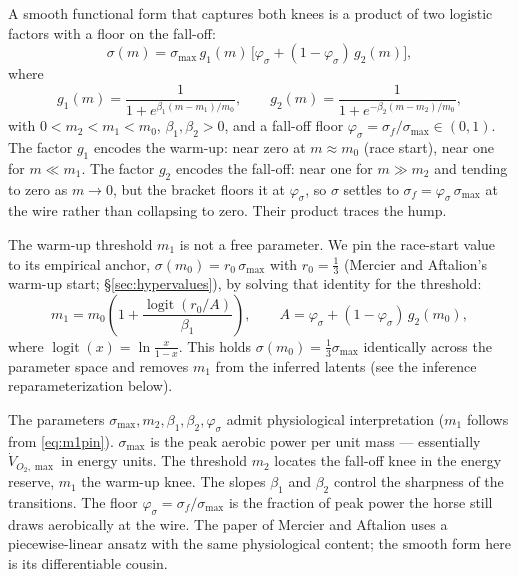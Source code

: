 \documentclass[11pt]{article}
\begin{document}
A smooth functional form that captures both knees is a product of two logistic factors with a floor on the fall-off:
\begin{equation}\label{eq:sigma}
\sigma(m) = \sigma_{\max}\,g_1(m)\,\bigl[\varphi_\sigma + (1 - \varphi_\sigma)\,g_2(m)\bigr],
\end{equation}
where
\[
g_1(m) = \frac{1}{1 + e^{\beta_1(m - m_1)/m_0}},\qquad
g_2(m) = \frac{1}{1 + e^{-\beta_2(m - m_2)/m_0}},
\]
with $0 < m_2 < m_1 < m_0$, $\beta_1, \beta_2 > 0$, and a fall-off floor $\varphi_\sigma = \sigma_f/\sigma_{\max} \in (0, 1)$. The factor $g_1$ encodes the warm-up: near zero at $m \approx m_0$ (race start), near one for $m \ll m_1$. The factor $g_2$ encodes the fall-off: near one for $m \gg m_2$ and tending to zero as $m \to 0$, but the bracket floors it at $\varphi_\sigma$, so $\sigma$ settles to $\sigma_f = \varphi_\sigma\,\sigma_{\max}$ at the wire rather than collapsing to zero. Their product traces the hump.

The warm-up threshold $m_1$ is not a free parameter. We pin the race-start value to its empirical anchor, $\sigma(m_0) = r_0\,\sigma_{\max}$ with $r_0 = \tfrac13$ (Mercier and Aftalion's warm-up start; \S\ref{sec:hypervalues}), by solving that identity for the threshold:
\begin{equation}\label{eq:m1pin}
m_1 = m_0\left(1 + \frac{\operatorname{logit}(r_0/A)}{\beta_1}\right), \qquad A = \varphi_\sigma + (1 - \varphi_\sigma)\,g_2(m_0),
\end{equation}
where $\operatorname{logit}(x) = \ln\!\frac{x}{1-x}$. This holds $\sigma(m_0) = \tfrac13\sigma_{\max}$ identically across the parameter space and removes $m_1$ from the inferred latents (see the inference reparameterization below).

The parameters $\sigma_{\max}, m_2, \beta_1, \beta_2, \varphi_\sigma$ admit physiological interpretation ($m_1$ follows from \eqref{eq:m1pin}). $\sigma_{\max}$ is the peak aerobic power per unit mass --- essentially $\dot V_{O_2,\max}$ in energy units. The threshold $m_2$ locates the fall-off knee in the energy reserve, $m_1$ the warm-up knee. The slopes $\beta_1$ and $\beta_2$ control the sharpness of the transitions. The floor $\varphi_\sigma = \sigma_f/\sigma_{\max}$ is the fraction of peak power the horse still draws aerobically at the wire. The paper of Mercier and Aftalion uses a piecewise-linear ansatz with the same physiological content; the smooth form here is its differentiable cousin.
\end{document}
